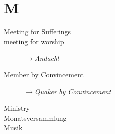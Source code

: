 \section*{M}

\articlesize

\begin{description}

 \item[Meeting for Sufferings]
 
 \item[meeting for worship]  $\to$\textit{Andacht}

 \item[Member by Convincement] $\to$\textit{Quaker by Convincement}
 
 \item[Ministry]
 
 \item[Monatsversammlung]
 
 \item[Musik]
 
 \end{description}

\normalsize
